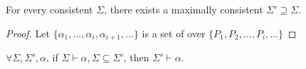 \begin{lemma}
For every consistent $\Sigma$, there exists a maximally consistent $\Sigma' \supseteq \Sigma$.
\end{lemma}

\begin{proof}
Let $\{\alpha_1, \ldots, \alpha_i, \alpha_{i+1}, \ldots\}$ is a set of \wff over $\{P_1,P_2,\ldots,P_i,\ldots\}$
\end{proof}

\begin{definition}[Monotonicity]
  $\forall \Sigma, \Sigma', \alpha$, if $\Sigma\vdash\alpha, \Sigma\subseteq\Sigma'$, then $\Sigma'\vdash\alpha$.
\end{definition}